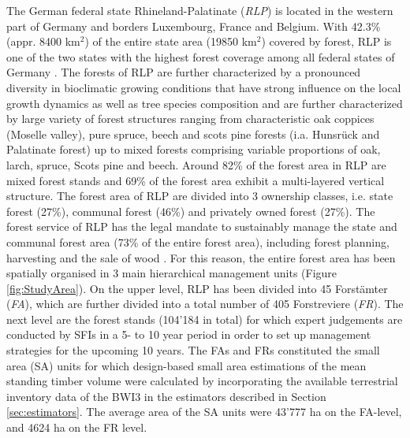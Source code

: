 The German federal state Rhineland-Palatinate (\textit{RLP}) is located in the western part of Germany and borders Luxembourg, France and Belgium. With 42.3\% (appr. 8400 km$^2$) of the entire state area (19850 km$^2$) covered by forest, RLP is one of the two states with the highest forest coverage among all federal states of Germany \citep{bwi3}. The forests of RLP are further characterized by a pronounced diversity in bioclimatic growing conditions that have strong influence on the local growth dynamics as well as tree species composition \citep{gauer2005} and are further characterized by large variety of forest structures ranging from characteristic oak coppices (Moselle valley), pure spruce, beech and scots pine forests (i.a. Hunsr{\"u}ck and Palatinate forest) up to mixed forests comprising variable proportions of oak, larch, spruce, Scots pine and beech. Around 82\% of the forest area in RLP are mixed forest stands and 69\% of the forest area exhibit a multi-layered vertical structure. The forest area of RLP are divided into 3 ownership classes, i.e. state forest (27\%), communal forest (46\%) and privately owned forest (27\%). The forest service of RLP has the legal mandate to sustainably manage the state and communal forest area (73\% of the entire forest area), including forest planning, harvesting and the sale of wood \citep{lwaldg_rlp}. For this reason, the entire forest area has been spatially organised in 3 main hierarchical management units (Figure \ref{fig:StudyArea}). On the upper level, RLP has been divided into 45 Forst{\"a}mter (\textit{FA}), which are further divided into a total number of 405 Forstreviere (\textit{FR}). The next level are the forest stands (104'184 in total) for which expert judgements are conducted by SFIs in a 5- to 10 year period in order to set up management strategies for the upcoming 10 years. The FAs and FRs constituted the small area (SA) units for which design-based small area estimations of the mean standing timber volume were calculated by incorporating the available terrestrial inventory data of the BWI3 in the estimators described in Section \ref{sec:estimators}. The average area of the SA units were 43'777 ha on the FA-level, and 4624 ha on the FR level.



